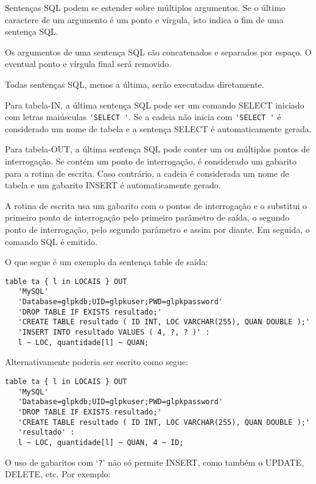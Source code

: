 \documentclass[11pt, brazil]{report}
\begin{document}
Sentenças SQL podem se estender sobre múltiplos argumentos. Se o último
caractere de um argumento é um ponto e vírgula, isto indica o fim de uma
sentença SQL.

Os argumentos de uma sentença SQL são concatenados e separados por espaço.
O eventual ponto e vírgula final será removido.

Todas sentenças SQL, menos a última, serão executadas diretamente.

Para tabela-IN, a última sentença SQL pode ser um comando SELECT iniciado
com letras maiúsculas \verb|'SELECT '|. Se a cadeia não inicia com
\verb|'SELECT '| é considerado um nome de tabela e a sentença
SELECT é automaticamente gerada.

Para tabela-OUT, a última sentença SQL pode conter um ou múltiplos pontos de
interrogação. Se contém um ponto de interrogação, é considerado um gabarito
para a rotina de escrita. Caso contrário, a cadeia é considerada um
nome de tabela e um gabarito INSERT é automaticamente gerado.

A rotina de escrita usa um gabarito com o pontos de interrogação e
o substitui o primeiro ponto de interrogação pelo primeiro parâmetro
de saída, o segundo ponto de interrogação, pelo segundo parâmetro e
assim por diante. Em seguida, o comando SQL é emitido.

O que segue é um exemplo da sentença table de saída:

\begin{verbatim}
table ta { l in LOCAIS } OUT
   'MySQL'
   'Database=glpkdb;UID=glpkuser;PWD=glpkpassword'
   'DROP TABLE IF EXISTS resultado;'
   'CREATE TABLE resultado ( ID INT, LOC VARCHAR(255), QUAN DOUBLE );'
   'INSERT INTO resultado VALUES ( 4, ?, ? )' :
   l ~ LOC, quantidade[l] ~ QUAN;
\end{verbatim}

\noindent
Alternativamente poderia ser escrito como segue:

\begin{verbatim}
table ta { l in LOCAIS } OUT
   'MySQL'
   'Database=glpkdb;UID=glpkuser;PWD=glpkpassword'
   'DROP TABLE IF EXISTS resultado;'
   'CREATE TABLE resultado ( ID INT, LOC VARCHAR(255), QUAN DOUBLE );'
   'resultado' :
   l ~ LOC, quantidade[l] ~ QUAN, 4 ~ ID;
\end{verbatim}


O uso de gabaritos com `\verb|?|' não só permite INSERT, como também o
UPDATE, DELETE, etc. Por exemplo:
\end{document}
